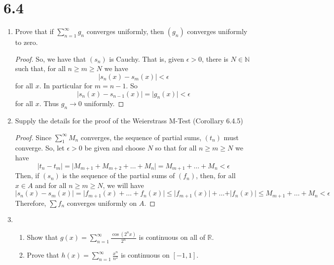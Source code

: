 \section*{6.4}
\begin{enumerate}
    \item Prove that if \( \sum_{n=1}^{\infty} g_n \) converges uniformly, then \( (g_n) \) converges uniformly to zero.
    
    \begin{proof}
    So, we have that \( (s_n) \) is Cauchy. That is, given \( \epsilon > 0 \), there is \( N \in \mathbb{N} \) such that, for all \( n \geq m \geq N \) we have
    \[
    \vert s_n(x) - s_m(x) \vert < \epsilon
    \]
    for all \( x \). In particular for \( m = n-1 \). So
    \[
    \vert s_n(x) - s_{n-1}(x) \vert = \vert g_n(x) \vert < \epsilon
    \]
    for all \( x \). Thus \( g_n \rightarrow 0 \) uniformly.
    \end{proof}
    
    \item Supply the details for the proof of the Weierstrass M-Test (Corollary 6.4.5)
    
    \begin{proof}
    Since \( \sum_{1}^{\infty} M_n \) converges, the sequence of partial sums, \( (t_n) \) must converge. So, let \( \epsilon > 0 \) be given and choose \( N \) so that for all \( n \geq m \geq N \) we have
    \[
    \vert t_n - t_m \vert = \vert M_{m+1} + M_{m+2} + \ldots + M_n \vert = M_{m+1} + \ldots + M_n < \epsilon
    \]
    Then, if \( (s_n) \) is the sequence of the partial sums of \( (f_n) \), then, for all \( x \in A \) and for all \( n \geq m \geq N \), we will have
    \[
    \vert s_n(x) - s_m(x) \vert = \vert f_{m+1}(x) + \ldots + f_n(x) \vert \leq \vert f_{m+1}(x) \vert + \ldots + \vert f_n(x) \vert \leq M_{m+1} + \ldots + M_n < \epsilon
    \]
    Therefore, \( \sum f_n \) converges uniformly on \( A \). 
    \end{proof}
    
    \item \begin{enumerate}
        \item Show that \( g(x) = \sum_{n=1}^{\infty} \frac{\cos(2^nx)}{2^n} \) is continuous on all of \( \mathbb{R} \).
        
        \item Prove that \( h(x) = \sum_{n=1}^{\infty} \frac{x^n}{n^2} \) is continuous on \( [-1,1] \). 
    \end{enumerate}
    

\end{enumerate}
